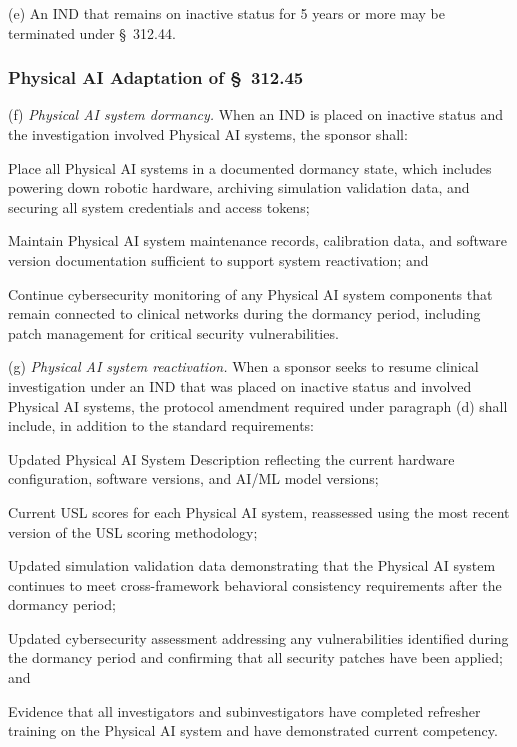 \documentclass[11pt]{article}
\begin{document}
(e) An IND that remains on inactive status for 5 years or more may be terminated under \S~312.44.

\subsubsection{Physical AI Adaptation of \S~312.45}

(f) \textit{Physical AI system dormancy.} When an IND is placed on inactive status and the investigation involved Physical AI systems, the sponsor shall:

\begin{description}[leftmargin=0.8cm,style=sameline]
\item[(i)] Place all Physical AI systems in a documented dormancy state, which includes powering down robotic hardware, archiving simulation validation data, and securing all system credentials and access tokens;
\item[(ii)] Maintain Physical AI system maintenance records, calibration data, and software version documentation sufficient to support system reactivation; and
\item[(iii)] Continue cybersecurity monitoring of any Physical AI system components that remain connected to clinical networks during the dormancy period, including patch management for critical security vulnerabilities.
\end{description}

(g) \textit{Physical AI system reactivation.} When a sponsor seeks to resume clinical investigation under an IND that was placed on inactive status and involved Physical AI systems, the protocol amendment required under paragraph (d) shall include, in addition to the standard requirements:

\begin{description}[leftmargin=0.8cm,style=sameline]
\item[(i)] Updated Physical AI System Description reflecting the current hardware configuration, software versions, and AI/ML model versions;
\item[(ii)] Current USL scores for each Physical AI system, reassessed using the most recent version of the USL scoring methodology;
\item[(iii)] Updated simulation validation data demonstrating that the Physical AI system continues to meet cross-framework behavioral consistency requirements after the dormancy period;
\item[(iv)] Updated cybersecurity assessment addressing any vulnerabilities identified during the dormancy period and confirming that all security patches have been applied; and
\item[(v)] Evidence that all investigators and subinvestigators have completed refresher training on the Physical AI system and have demonstrated current competency.
\end{description}
\end{document}
